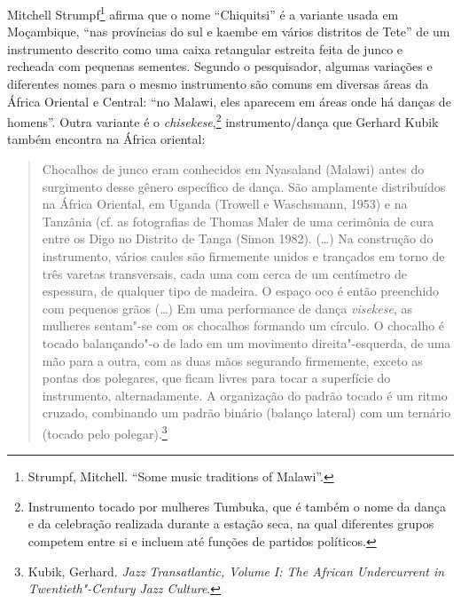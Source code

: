 Mitchell Strumpf\footnote{Strumpf, Mitchell. ``Some music traditions of
  Malawi''.} afirma que o nome ``Chiquitsi'' é a variante usada em
Moçambique, ``nas províncias do sul e kaembe em vários distritos de
Tete'' de um instrumento descrito como uma caixa retangular estreita
feita de junco e recheada com pequenas sementes. Segundo o pesquisador,
algumas variações e diferentes nomes para o mesmo instrumento são comuns
em diversas áreas da África Oriental e Central: ``no Malawi, eles
aparecem em áreas onde há danças de homens''. Outra variante é o
\emph{chisekese},\footnote{Instrumento tocado por mulheres Tumbuka, que
  é também o nome da dança e da celebração realizada durante a estação
  seca, na qual diferentes grupos competem entre si e incluem até
  funções de partidos políticos.} instrumento/dança que Gerhard Kubik
também encontra na África oriental:

\begin{quote}
Chocalhos de junco eram conhecidos em Nyasaland (Malawi) antes do
surgimento desse gênero específico de dança. São amplamente distribuídos
na África Oriental, em Uganda (Trowell e Waschsmann, 1953) e na Tanzânia
(cf. as fotografias de Thomas Maler de uma cerimônia de cura entre os
Digo no Distrito de Tanga (Simon 1982). (\ldots{}) Na construção do
instrumento, vários caules são firmemente unidos e trançados em torno de
três varetas transversais, cada uma com cerca de um centímetro de
espessura, de qualquer tipo de madeira. O espaço oco é então preenchido
com pequenos grãos (\ldots{}) Em uma performance de dança \emph{visekese}, as
mulheres sentam"-se com os chocalhos formando um círculo. O chocalho é
tocado balançando"-o de lado em um movimento direita"-esquerda, de uma mão
para a outra, com as duas mãos segurando firmemente, exceto as pontas
dos polegares, que ficam livres para tocar a superfície do instrumento,
alternadamente. A organização do padrão tocado é um ritmo cruzado,
combinando um padrão binário (balanço lateral) com um ternário (tocado
pelo polegar).\footnote{Kubik, Gerhard. \emph{Jazz Transatlantic, Volume
  I: The African Undercurrent in Twentieth"-Century Jazz Culture}.}
\end{quote}

